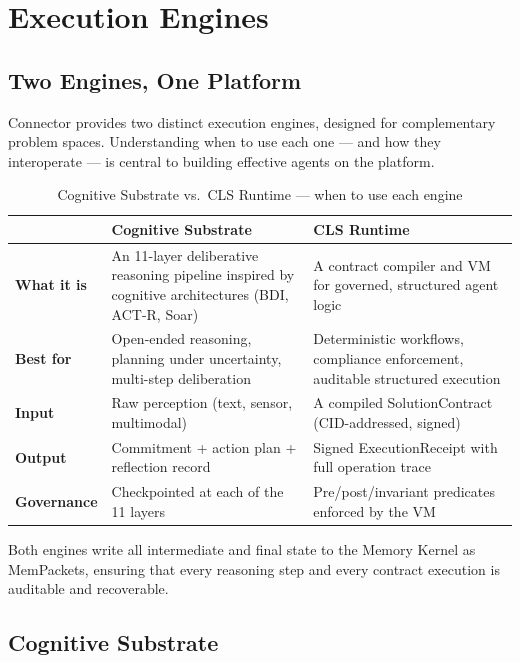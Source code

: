 \chapter{Execution Engines}

\section{Two Engines, One Platform}

Connector provides two distinct execution engines, designed for complementary
problem spaces. Understanding when to use each one — and how they interoperate
— is central to building effective agents on the platform.

\begin{table}[H]
\centering
\renewcommand{\arraystretch}{1.5}
\begin{tabularx}{\textwidth}{@{}lXX@{}}
\toprule
 & \textbf{Cognitive Substrate} & \textbf{CLS Runtime} \\
\midrule
\textbf{What it is} &
  An 11-layer deliberative reasoning pipeline inspired by cognitive
  architectures (BDI, ACT-R, Soar) &
  A contract compiler and VM for governed, structured agent logic \\
\textbf{Best for} &
  Open-ended reasoning, planning under uncertainty, multi-step
  deliberation &
  Deterministic workflows, compliance enforcement, auditable
  structured execution \\
\textbf{Input} &
  Raw perception (text, sensor, multimodal) &
  A compiled SolutionContract (CID-addressed, signed) \\
\textbf{Output} &
  Commitment + action plan + reflection record &
  Signed ExecutionReceipt with full operation trace \\
\textbf{Governance} &
  Checkpointed at each of the 11 layers &
  Pre/post/invariant predicates enforced by the VM \\
\bottomrule
\end{tabularx}
\caption{Cognitive Substrate vs.\ CLS Runtime — when to use each engine}
\end{table}

Both engines write all intermediate and final state to the Memory Kernel as
MemPackets, ensuring that every reasoning step and every contract execution is
auditable and recoverable.

\section{Cognitive Substrate}

